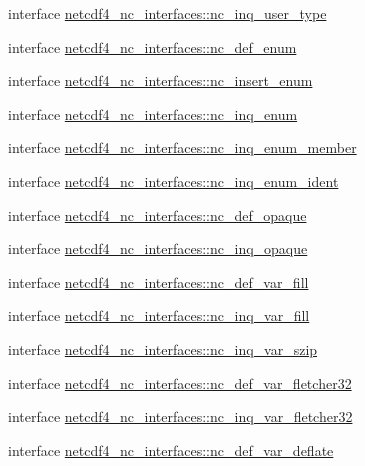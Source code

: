 \begin{DoxyCompactItemize}
\item 
interface \hyperlink{interfacenetcdf4__nc__interfaces_1_1nc__inq__user__type}{netcdf4\+\_\+nc\+\_\+interfaces\+::nc\+\_\+inq\+\_\+user\+\_\+type}
\item 
interface \hyperlink{interfacenetcdf4__nc__interfaces_1_1nc__def__enum}{netcdf4\+\_\+nc\+\_\+interfaces\+::nc\+\_\+def\+\_\+enum}
\item 
interface \hyperlink{interfacenetcdf4__nc__interfaces_1_1nc__insert__enum}{netcdf4\+\_\+nc\+\_\+interfaces\+::nc\+\_\+insert\+\_\+enum}
\item 
interface \hyperlink{interfacenetcdf4__nc__interfaces_1_1nc__inq__enum}{netcdf4\+\_\+nc\+\_\+interfaces\+::nc\+\_\+inq\+\_\+enum}
\item 
interface \hyperlink{interfacenetcdf4__nc__interfaces_1_1nc__inq__enum__member}{netcdf4\+\_\+nc\+\_\+interfaces\+::nc\+\_\+inq\+\_\+enum\+\_\+member}
\item 
interface \hyperlink{interfacenetcdf4__nc__interfaces_1_1nc__inq__enum__ident}{netcdf4\+\_\+nc\+\_\+interfaces\+::nc\+\_\+inq\+\_\+enum\+\_\+ident}
\item 
interface \hyperlink{interfacenetcdf4__nc__interfaces_1_1nc__def__opaque}{netcdf4\+\_\+nc\+\_\+interfaces\+::nc\+\_\+def\+\_\+opaque}
\item 
interface \hyperlink{interfacenetcdf4__nc__interfaces_1_1nc__inq__opaque}{netcdf4\+\_\+nc\+\_\+interfaces\+::nc\+\_\+inq\+\_\+opaque}
\item 
interface \hyperlink{interfacenetcdf4__nc__interfaces_1_1nc__def__var__fill}{netcdf4\+\_\+nc\+\_\+interfaces\+::nc\+\_\+def\+\_\+var\+\_\+fill}
\item 
interface \hyperlink{interfacenetcdf4__nc__interfaces_1_1nc__inq__var__fill}{netcdf4\+\_\+nc\+\_\+interfaces\+::nc\+\_\+inq\+\_\+var\+\_\+fill}
\item 
interface \hyperlink{interfacenetcdf4__nc__interfaces_1_1nc__inq__var__szip}{netcdf4\+\_\+nc\+\_\+interfaces\+::nc\+\_\+inq\+\_\+var\+\_\+szip}
\item 
interface \hyperlink{interfacenetcdf4__nc__interfaces_1_1nc__def__var__fletcher32}{netcdf4\+\_\+nc\+\_\+interfaces\+::nc\+\_\+def\+\_\+var\+\_\+fletcher32}
\item 
interface \hyperlink{interfacenetcdf4__nc__interfaces_1_1nc__inq__var__fletcher32}{netcdf4\+\_\+nc\+\_\+interfaces\+::nc\+\_\+inq\+\_\+var\+\_\+fletcher32}
\item 
interface \hyperlink{interfacenetcdf4__nc__interfaces_1_1nc__def__var__deflate}{netcdf4\+\_\+nc\+\_\+interfaces\+::nc\+\_\+def\+\_\+var\+\_\+deflate}

\end{DoxyCompactItemize}
